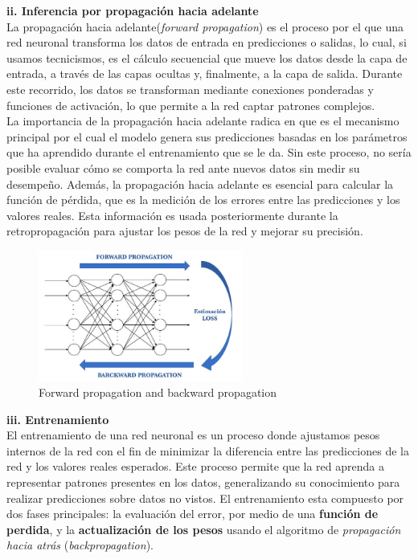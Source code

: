 \documentclass[11pt]{article} %
\begin{document}
\textbf{ii. Inferencia por propagación hacia adelante} \\[3pt]
La propagación hacia adelante(\textit{forward propagation}) es el proceso por el que una red neuronal transforma los datos de entrada en predicciones o salidas, lo cual, si usamos tecnicismos, es el cálculo secuencial que mueve los datos desde la capa de entrada, a través de las capas ocultas y, finalmente, a la capa de salida. Durante este recorrido, los datos se transforman mediante conexiones ponderadas y funciones de activación, lo que permite a la red captar patrones complejos. \\
La importancia de la propagación hacia adelante radica en que es el mecanismo principal por el cual el modelo genera sus predicciones basadas en los parámetros que ha aprendido durante el entrenamiento que se le da. Sin este proceso, no sería posible evaluar cómo se comporta la red ante nuevos datos sin medir su desempeño. Además, la propagación hacia adelante es esencial para calcular la función de pérdida, que es la medición de los errores entre las predicciones y los valores reales. Esta información es usada posteriormente durante la retropropagación  para ajustar los pesos de la red y mejorar su precisión.
\begin{figure}[H]
    \centering
    \includegraphics[width=0.6\textwidth]{Images/3eafe158-4126-48f0-ae70-65e707cc8988_668x427.jpg}
    \caption{Forward propagation and backward propagation}
    \label{fig:estructura-red-neuronal}
\end{figure}
\textbf{iii. Entrenamiento} \\[3pt]
El entrenamiento de una red neuronal es un proceso donde ajustamos pesos internos de la red con el fin de minimizar la diferencia entre las predicciones de la red y los valores reales esperados. Este proceso permite que la red aprenda a representar patrones presentes en los datos, generalizando su conocimiento para realizar predicciones sobre datos no vistos. El entrenamiento esta compuesto por dos fases principales: la evaluación del error, por medio de una \textbf{función de perdida}, y la \textbf{actualización de los pesos} usando el algoritmo de \textit{propagación hacia atrás} (\textit{backpropagation}).
\end{document}
